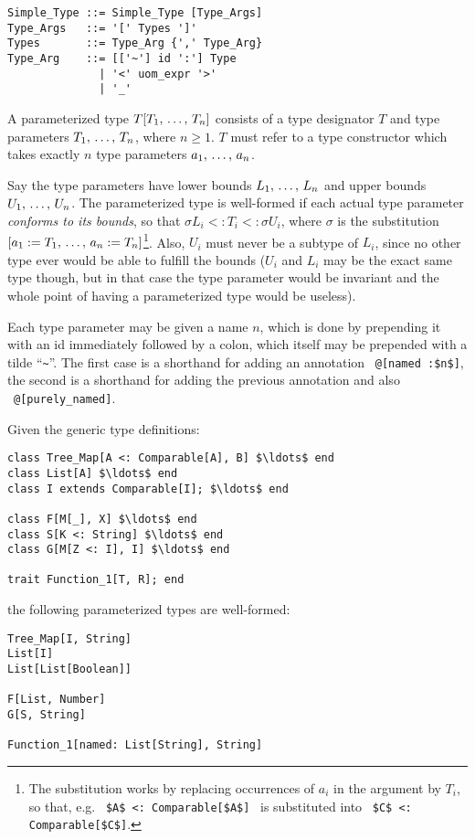 \syntax\begin{lstlisting}
Simple_Type ::= Simple_Type [Type_Args]
Type_Args   ::= '[' Types ']'
Types       ::= Type_Arg {',' Type_Arg}
Type_Arg    ::= [['~'] id ':'] Type 
              | '<' uom_expr '>'
              | '_'
\end{lstlisting}

A parameterized type $T[T_1 ,\, \ldots ,\, T_n]$ consists of a type designator $T$ and type parameters $T_1 ,\, \ldots ,\, T_n$, where $n \geq 1$. $T$ must refer to a type constructor which takes exactly $n$ type parameters $a_1 ,\, \ldots ,\, a_n$. 

Say the type parameters have lower bounds $L_1 ,\, \ldots ,\, L_n$ and upper bounds $U_1 ,\, \ldots ,\, U_n$. The parameterized type is well-formed if each actual type parameter {\em conforms to its bounds}, so that $\sigma L_i <: T_i <: \sigma U_i$, where $\sigma$ is the substitution $[a_1 := T_1 ,\, \ldots ,\, a_n := T_n]$\footnote{The substitution works by replacing occurrences of $a_i$ in the argument by $T_i$, so that, e.g. ~\lstinline!$A$ <: Comparable[$A$]!~ is substituted into ~\lstinline!$C$ <: Comparable[$C$]!.}. Also, $U_i$ must never be a subtype of $L_i$, since no other type ever would be able to fulfill the bounds ($U_i$ and $L_i$ may be the exact same type though, but in that case the type parameter would be invariant and the whole point of having a parameterized type would be useless). 

Each type parameter may be given a name $n$, which is done by prepending it with an id immediately followed by a colon, which itself may be prepended with a tilde ``\lstinline!~!''. The first case is a shorthand for adding an annotation ~\lstinline!@[named :$n$]!, the second is a shorthand for adding the previous annotation and also ~\lstinline!@[purely_named]!. 

\example
\label{example:parameterized-types}
Given the generic type definitions: 

\begin{lstlisting}
class Tree_Map[A <: Comparable[A], B] $\ldots$ end
class List[A] $\ldots$ end
class I extends Comparable[I]; $\ldots$ end

class F[M[_], X] $\ldots$ end
class S[K <: String] $\ldots$ end
class G[M[Z <: I], I] $\ldots$ end

trait Function_1[T, R]; end
\end{lstlisting}

the following parameterized types are well-formed: 

\begin{lstlisting}
Tree_Map[I, String]
List[I]
List[List[Boolean]]

F[List, Number]
G[S, String]

Function_1[named: List[String], String]
\end{lstlisting}

